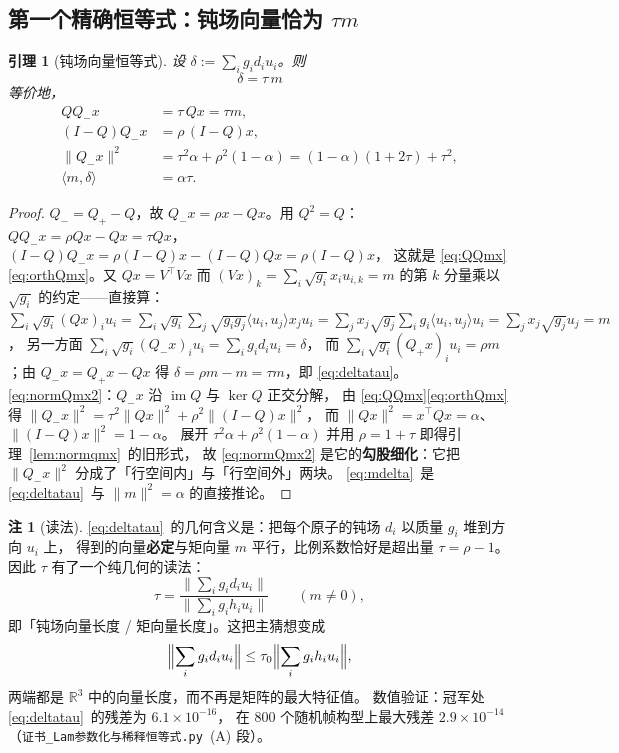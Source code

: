 \documentclass[UTF8,11pt]{ctexart}
\newtheorem{lemma}[theorem]{引理}
\theoremstyle{definition}
\newtheorem{remark}[theorem]{注}
\newcommand{\R}{\mathbb{R}}
\begin{document}
\subsection{第一个精确恒等式：钝场向量恰为 $\tau m$}\label{sec:r18:delta}

\begin{lemma}[钝场向量恒等式]\label{lem:deltautau}
设 $\delta:=\sum_ig_id_iu_i$。则
\begin{equation}\label{eq:deltatau}
\boxed{\ \delta=\tau\,m\ }
\end{equation}
等价地，
\begin{align}
QQ_-x&=\tau\,Qx=\tau m, \label{eq:QQmx}\\
(I-Q)Q_-x&=\rho\,(I-Q)x, \label{eq:orthQmx}\\
\|Q_-x\|^2&=\tau^2\alpha+\rho^2(1-\alpha)=(1-\alpha)(1+2\tau)+\tau^2, \label{eq:normQmx2}\\
\langle m,\delta\rangle&=\alpha\tau . \label{eq:mdelta}
\end{align}
\end{lemma}

\begin{proof}
$Q_-=Q_+-Q$，故 $Q_-x=\rho x-Qx$。用 $Q^2=Q$：
$QQ_-x=\rho Qx-Qx=\tau Qx$，$(I-Q)Q_-x=\rho(I-Q)x-(I-Q)Qx=\rho(I-Q)x$，
这就是 \eqref{eq:QQmx}\eqref{eq:orthQmx}。又 $Qx=V^\top Vx$ 而
$(Vx)_k=\sum_i\sqrt{g_i}x_iu_{i,k}=m$ 的第 $k$ 分量乘以 $\sqrt{g_i}$ 的约定——直接算：
$\sum_i\sqrt{g_i}(Qx)_iu_i=\sum_i\sqrt{g_i}\sum_j\sqrt{g_ig_j}\langle u_i,u_j\rangle x_ju_i
=\sum_j x_j\sqrt{g_j}\sum_ig_i\langle u_i,u_j\rangle u_i=\sum_jx_j\sqrt{g_j}u_j=m$，
另一方面 $\sum_i\sqrt{g_i}(Q_-x)_iu_i=\sum_ig_id_iu_i=\delta$，
而 $\sum_i\sqrt{g_i}(Q_+x)_iu_i=\rho m$；由 $Q_-x=Q_+x-Qx$ 得 $\delta=\rho m-m=\tau m$，即 \eqref{eq:deltatau}。
\eqref{eq:normQmx2}：$Q_-x$ 沿 $\operatorname{im}Q$ 与 $\ker Q$ 正交分解，
由 \eqref{eq:QQmx}\eqref{eq:orthQmx} 得 $\|Q_-x\|^2=\tau^2\|Qx\|^2+\rho^2\|(I-Q)x\|^2$，
而 $\|Qx\|^2=x^\top Qx=\alpha$、$\|(I-Q)x\|^2=1-\alpha$。
展开 $\tau^2\alpha+\rho^2(1-\alpha)$ 并用 $\rho=1+\tau$ 即得引理~\ref{lem:normqmx}~的旧形式，
故 \eqref{eq:normQmx2} 是它的\textbf{勾股细化}：它把 $\|Q_-x\|^2$ 分成了「行空间内」与「行空间外」两块。
\eqref{eq:mdelta}~是 \eqref{eq:deltatau}~与 $\|m\|^2=\alpha$ 的直接推论。
\end{proof}

\begin{remark}[读法]\label{rmk:deltaread}
\eqref{eq:deltatau}~的几何含义是：把每个原子的钝场 $d_i$ 以质量 $g_i$ 堆到方向 $u_i$ 上，
得到的向量\textbf{必定}与矩向量 $m$ 平行，比例系数恰好是超出量 $\tau=\rho-1$。
因此 $\tau$ 有了一个纯几何的读法：
\begin{equation}\label{eq:tauread}
\tau=\frac{\bigl\|\sum_ig_id_iu_i\bigr\|}{\bigl\|\sum_ig_ih_iu_i\bigr\|}\qquad(m\ne0),
\end{equation}
即「钝场向量长度 / 矩向量长度」。这把主猜想变成
\[
\Bigl\|\sum_ig_id_iu_i\Bigr\|\le\tau_0\Bigl\|\sum_ig_ih_iu_i\Bigr\|,
\]
两端都是 $\R^3$ 中的向量长度，而不再是矩阵的最大特征值。
数值验证：冠军处 \eqref{eq:deltatau}~的残差为 $6.1\times10^{-16}$，
在 $800$ 个随机帧构型上最大残差 $2.9\times10^{-14}$
（\texttt{证书\_Lam参数化与稀释恒等式.py}~(A) 段）。
\end{remark}
\end{document}

